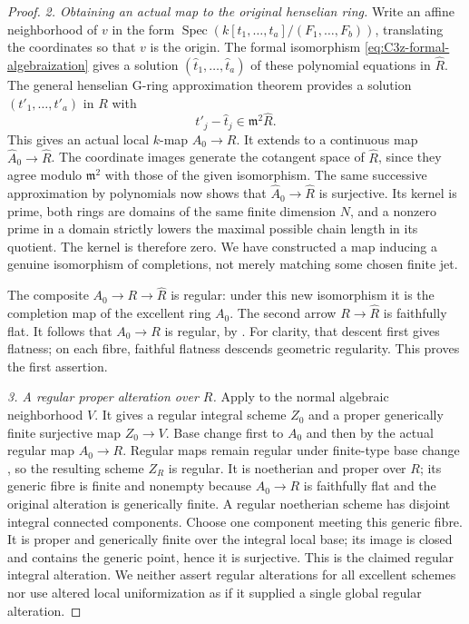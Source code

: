 \begin{proof}
\emph{2. Obtaining an actual map to the original henselian ring.}
Write an affine neighborhood of $v$ in the form
$\operatorname{Spec}(k[t_1,\ldots,t_a]/(F_1,\ldots,F_b))$,
translating the coordinates so that $v$ is the origin.
The formal isomorphism \eqref{eq:C3z-formal-algebraization}
gives a solution $(\widehat t_1,\ldots,\widehat t_a)$
of these polynomial equations in $\widehat R$.
The general henselian G-ring approximation theorem
\citep[Theorem 16.13.1, Tag 07QY]{rootStacksRegularApproximation}
provides a solution $(t'_1,\ldots,t'_a)$ in $R$ with
\[
                   t'_j-\widehat t_j\in\mathfrak m^2\widehat R.
\]
This gives an actual local $k$-map $A_0\to R$.
It extends to a continuous map
$\widehat A_0\to\widehat R$.
The coordinate images generate the cotangent space
of $\widehat R$, since they agree modulo
$\mathfrak m^2$ with those of the given isomorphism.
The same successive approximation by polynomials now
shows that $\widehat A_0\to\widehat R$ is surjective.
Its kernel is prime, both rings are domains of the
same finite dimension $N$, and a nonzero prime in a
domain strictly lowers the maximal possible chain
length in its quotient. The kernel is therefore zero.
We have constructed a map inducing a genuine
isomorphism of completions, not merely matching
some chosen finite jet.

The composite $A_0\to R\to\widehat R$ is regular:
under this new isomorphism it is the completion map
of the excellent ring $A_0$.
The second arrow $R\to\widehat R$ is faithfully flat.
It follows that $A_0\to R$ is regular, by
\citet[Lemma 15.42.7, Tag 07NT]{rootStacksRegularApproximation}.
For clarity, that descent first gives flatness;
on each fibre, faithful flatness descends geometric
regularity. This proves the first assertion.

\emph{3. A regular proper alteration over $R$.}
Apply \citet[Theorem 4.1 and Remark 4.2, p.~66]{D_DeJong1996Alterations}
to the normal algebraic neighborhood $V$.
It gives a regular integral scheme $Z_0$ and a proper
generically finite surjective map $Z_0\to V$.
Base change first to $A_0$ and then by the actual
regular map $A_0\to R$.
Regular maps remain regular under finite-type base
change \citep[Lemma 15.42.3, Tag 07BY]{rootStacksRegularApproximation},
so the resulting scheme $Z_R$ is regular.
It is noetherian and proper over $R$; its generic
fibre is finite and nonempty because $A_0\to R$
is faithfully flat and the original alteration is
generically finite. A regular noetherian scheme
has disjoint integral connected components.
Choose one component meeting this generic fibre.
It is proper and generically finite over the
integral local base; its image is closed and
contains the generic point, hence it is surjective.
This is the claimed regular integral alteration.
We neither assert regular alterations for all
excellent schemes nor use altered local uniformization
as if it supplied a single global regular alteration.


\end{proof}
